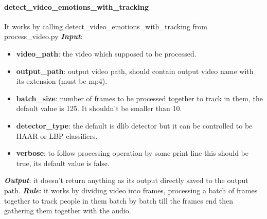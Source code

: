 \paragraph{detect\_video\_emotions\_with\_tracking}
It works by calling detect\_video\_emotions\_with\_tracking from process\_video.py
\newline \textbf{\textit{Input}}: 
\begin{itemize}
\item  \textbf{video\_path}: the video which supposed to be processed.
\item  \textbf{output\_path}: output video path, should contain output video name with its extension (must be mp4).
\item  \textbf{batch\_size}: number of frames to be processed together to track in them, the default value is 125. \newline It shouldn't be smaller than 10.
\item \textbf{detector\_type}: the default is dlib detector but it can be controlled to be HAAR or LBP classifiers.
\item  \textbf{verbose}: to follow processing operation by some print line this should be true, its default value is false.
\end{itemize}
\newline \textbf{\textit{Output}}: it doesn't return anything as its output directly saved to the output path.
\newline\textbf{\textit{Rule}}: it works by dividing video into frames, processing a batch of frames together to track people in them batch by batch till the frames end then gathering them together with the audio.
\newline 